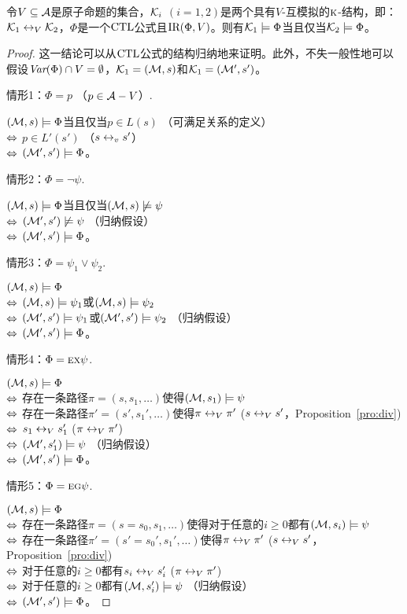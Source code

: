  \begin{theorem}\label{thm:V-bisimulation:EQ}
 	令$V\subseteq {\cal A}$是原子命题的集合，${\cal K}_i$ $(i=1,2)$是两个具有$V$-互模拟的$\textsc{k}$-结构，即：${\cal K}_1 \leftrightarrow_V {\cal K}_2$，$\Phi$是一个$\textrm{CTL}$公式且$\textrm{IR}(\Phi, V)$。则有${\cal K}_1\models \Phi$当且仅当${\cal K}_2\models \Phi$。
 \end{theorem}
\begin{proof}
	这一结论可以从$\textrm{CTL}$公式的结构归纳地来证明。此外，不失一般性地可以假设$\textit{Var}(\Phi) \cap V=\emptyset$，${\cal K}_1=({\cal M},s)$和${\cal K}_1=({\cal M}',s')$。
	
	情形1：$\Phi = p$ （$p\in {\cal A} -V$）.
	
	$({\cal M},s)\models \Phi$当且仅当$p\in L(s)$ \hfill （可满足关系的定义）\\
	$\Leftrightarrow$ $p\in L'(s')$ \hfill （$s \leftrightarrow_v s'$）\\
	$\Leftrightarrow$ $({\cal M}',s') \models \Phi$。
	
	情形2：$\Phi = \neg \psi$.
	
	$({\cal M},s)\models \Phi$当且仅当$({\cal M},s) \not \models \psi$\\
	$\Leftrightarrow$ $({\cal M}',s')\not \models \psi$  \hfill （归纳假设）\\
	$\Leftrightarrow$ $({\cal M}',s') \models \Phi$。
	
	情形3：$\Phi = \psi_1 \vee \psi_2$.
	
	$({\cal M},s)\models \Phi$\\
	$\Leftrightarrow$ $({\cal M},s) \models \psi_1$或$({\cal M},s) \models \psi_2$\\
	$\Leftrightarrow$ $({\cal M}',s')  \models \psi_1$或$({\cal M}',s') \models \psi_2$ \hfill （归纳假设）\\
	$\Leftrightarrow$ $({\cal M}',s') \models \Phi$。
	
	情形4：$\Phi=\textsc{e}\textsc{x}\psi$.
	
	$({\cal M},s)\models \Phi$\\
	$\Leftrightarrow$ 存在一条路径$\pi=(s,s_1,\dots)$使得$({\cal M},s_1)\models \psi$\\
	$\Leftrightarrow$ 存在一条路径$\pi'=(s',s_1',\dots)$使得$\pi \leftrightarrow_V \pi'$ \hfill ($s \leftrightarrow_V s'$，Proposition~\ref{pro:div})\\
	$\Leftrightarrow$ $s_1 \leftrightarrow_V s_1'$ \hfill ($\pi \leftrightarrow_V \pi'$)\\
	$\Leftrightarrow$ $({\cal M}',s_1') \models \psi$   \hfill   （归纳假设）\\
	$\Leftrightarrow$ $({\cal M}',s')\models \Phi$。
	
	情形5：$\Phi = \textsc{e} \textsc{g} \psi$.
	
		$({\cal M},s)\models \Phi$\\
	$\Leftrightarrow$ 存在一条路径$\pi=(s=s_0,s_1,\dots)$使得对于任意的$i\ge 0$都有$({\cal M},s_i)\models \psi$\\
	$\Leftrightarrow$ 存在一条路径$\pi'=(s'=s_0',s_1',\dots)$使得$\pi \leftrightarrow_V \pi'$ \hfill ($s \leftrightarrow_V s'$，Proposition~\ref{pro:div})\\
	$\Leftrightarrow$ 对于任意的$i\ge 0$都有$s_i \leftrightarrow_V s_i'$ \hfill ($\pi \leftrightarrow_V \pi'$)\\
	$\Leftrightarrow$ 对于任意的$i\ge 0$都有$({\cal M},s_i') \models \psi$ \hfill （归纳假设）\\
	$\Leftrightarrow$ $({\cal M}',s')\models \Phi$。
	

\end{proof}
